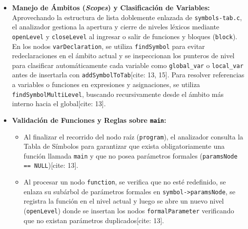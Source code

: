 \documentclass[12pt, a4paper]{article}
\begin{document}
\begin{itemize}
    \item \textbf{Manejo de Ámbitos (\textit{Scopes}) y Clasificación de Variables:} Aprovechando la estructura de lista doblemente enlazada de \texttt{symbols-tab.c}, el analizador gestiona la apertura y cierre de niveles léxicos mediante \texttt{openLevel} y \texttt{closeLevel} al ingresar o salir de funciones y bloques (\texttt{block}). En los nodos \texttt{varDeclaration}, se utiliza \texttt{findSymbol} para evitar redeclaraciones en el ámbito actual y se inspeccionan los punteros de nivel para clasificar automáticamente cada variable como \texttt{global\_var} o \texttt{local\_var} antes de insertarla con \texttt{addSymbolToTab}[cite: 13, 15]. Para resolver referencias a variables o funciones en expresiones y asignaciones, se utiliza \texttt{findSymbolMultiLevel}, buscando recursivamente desde el ámbito más interno hacia el global[cite: 13].
    
    \item \textbf{Validación de Funciones y Reglas sobre \texttt{main}:}
    \begin{itemize}
        \item Al finalizar el recorrido del nodo raíz (\texttt{program}), el analizador consulta la Tabla de Símbolos para garantizar que exista obligatoriamente una función llamada \texttt{main} y que no posea parámetros formales (\texttt{paramsNode == NULL})[cite: 13].
        \item Al procesar un nodo \texttt{function}, se verifica que no esté redefinido, se enlaza su subárbol de parámetros formales en \texttt{symbol->paramsNode}, se registra la función en el nivel actual y luego se abre un nuevo nivel (\texttt{openLevel}) donde se insertan los nodos \texttt{formalParameter} verificando que no existan parámetros duplicados[cite: 13].
    \end{itemize}
    

\end{itemize}
\end{document}
